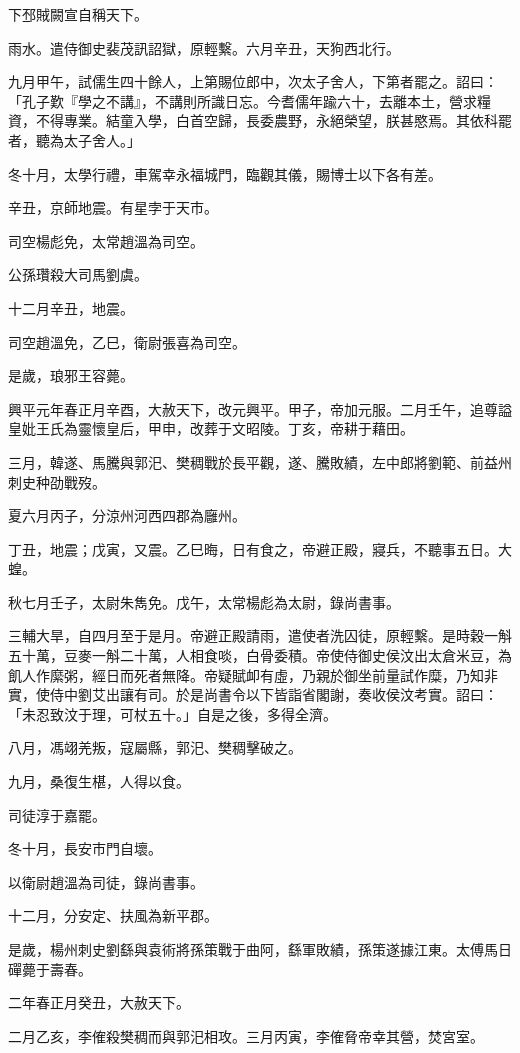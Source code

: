 \begin{pinyinscope}
下邳賊闕宣自稱天下。

雨水。遣侍御史裴茂訊詔獄，原輕繫。六月辛丑，天狗西北行。

九月甲午，試儒生四十餘人，上第賜位郎中，次太子舍人，下第者罷之。詔曰：「孔子歎『學之不講』，不講則所識日忘。今耆儒年踰六十，去離本土，營求糧資，不得專業。結童入學，白首空歸，長委農野，永絕榮望，朕甚愍焉。其依科罷者，聽為太子舍人。」

冬十月，太學行禮，車駕幸永福城門，臨觀其儀，賜博士以下各有差。

辛丑，京師地震。有星孛于天市。

司空楊彪免，太常趙溫為司空。

公孫瓚殺大司馬劉虞。

十二月辛丑，地震。

司空趙溫免，乙巳，衛尉張喜為司空。

是歲，琅邪王容薨。

興平元年春正月辛酉，大赦天下，改元興平。甲子，帝加元服。二月壬午，追尊謚皇妣王氏為靈懷皇后，甲申，改葬于文昭陵。丁亥，帝耕于藉田。

三月，韓遂、馬騰與郭汜、樊稠戰於長平觀，遂、騰敗績，左中郎將劉範、前益州刺史种劭戰歿。

夏六月丙子，分涼州河西四郡為廱州。

丁丑，地震；戊寅，又震。乙巳晦，日有食之，帝避正殿，寢兵，不聽事五日。大蝗。

秋七月壬子，太尉朱雋免。戊午，太常楊彪為太尉，錄尚書事。

三輔大旱，自四月至于是月。帝避正殿請雨，遣使者洗囚徒，原輕繫。是時穀一斛五十萬，豆麥一斛二十萬，人相食啖，白骨委積。帝使侍御史侯汶出太倉米豆，為飢人作縻粥，經日而死者無降。帝疑賦卹有虛，乃親於御坐前量試作糜，乃知非實，使侍中劉艾出讓有司。於是尚書令以下皆詣省閣謝，奏收侯汶考實。詔曰：「未忍致汶于理，可杖五十。」自是之後，多得全濟。

八月，馮翊羌叛，寇屬縣，郭汜、樊稠擊破之。

九月，桑復生椹，人得以食。

司徒淳于嘉罷。

冬十月，長安市門自壞。

以衛尉趙溫為司徒，錄尚書事。

十二月，分安定、扶風為新平郡。

是歲，楊州刺史劉繇與袁術將孫策戰于曲阿，繇軍敗績，孫策遂據江東。太傅馬日磾薨于壽春。

二年春正月癸丑，大赦天下。

二月乙亥，李傕殺樊稠而與郭汜相攻。三月丙寅，李傕脅帝幸其營，焚宮室。


\end{pinyinscope}
